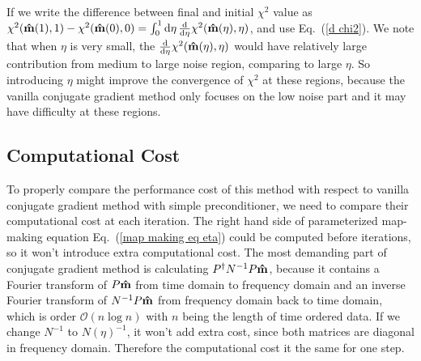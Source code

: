 \documentclass[twocolumn,linenumbers]{aastex631}
\newcommand{\vbd}{\vb{d}}
\newcommand{\inv}[1]{#1^{-1}}
\newcommand{\hatm}{\vb{\hat{m}}}
\newcommand{\Pdagger}{P^{\dagger}}
\newcommand{\Nbar}{\bar{N}}
\newcommand{\Neta}{N_{\eta}}
\begin{document}
If we write the difference between final and initial $\chi^2$ value as
$\chi^2(\hatm(1),1) - \chi^2(\hatm(0),0) = \int_0^1 \dd{\eta}
\dv{\eta} \chi^2(\hatm(\eta),\eta)$,
and use Eq.~(\ref{d chi2}).
We note that when $\eta$ is very small, 
the $\dv{\eta}\chi^2(\hatm(\eta),\eta)$ would have relatively large
contribution from medium to large noise region, comparing to large $\eta$.
So introducing $\eta$ might improve the convergence of $\chi^2$ at these
regions, because the vanilla conjugate gradient method only focuses on the low noise
part and it may have difficulty at these regions.


\subsection{Computational Cost}
To properly compare the performance cost of this method with respect to vanilla
conjugate gradient method with simple preconditioner,
we need to compare their computational cost at each iteration.
The right hand side of parameterized map-making equation
Eq.~(\ref{map making eq eta})
could be computed before iterations,
so it won't introduce extra computational cost.
The most demanding part of conjugate gradient method is calculating
$\Pdagger \inv{N} P \hatm$, because it contains a Fourier transform of
$P\hatm$ from time domain to frequency domain and an inverse Fourier transform
of $\inv{N} P \hatm$ from frequency domain back to time domain,
which is order $\mathcal{O}(n\log n)$ with $n$ being the length of time ordered
data.
If we change $\inv{N}$ to $\inv{N(\eta)}$, it won't add extra cost,
since both matrices are diagonal in frequency domain.
Therefore the computational cost it the same for one step.
\end{document}

